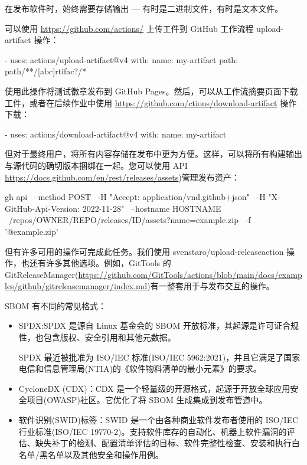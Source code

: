 
在发布软件时，始终需要存储输出 --- 有时是二进制文件，有时是文本文件。

可以使用 \url{https://github.com/actions/} 上传工件到 GitHub 工作流程 upload-artifact 操作：

\begin{shell}
- uses: actions/upload-artifact@v4
  with:
    name: my-artifact
    path: path/**/[abc]rtifac?/*
\end{shell}

使用此操作将测试徽章发布到 GitHub Pages。然后，可以从工作流摘要页面下载工件，或者在后续作业中使用 \url{https://github.com/ctions/download-artifact} 操作下载：

\begin{shell}
- uses: actions/download-artifact@v4
  with:
    name: my-artifact
\end{shell}

但对于最终用户，将所有内容存储在发布中更为方便。这样，可以将所有构建输出与源代码的确切版本捆绑在一起。您可以使用 API \url{https://docs.github.com/en/rest/releases/assets})管理发布资产：

\begin{shell}
gh api \
  --method POST \
  -H "Accept: application/vnd.github+json" \
  -H "X-GitHub-Api-Version: 2022-11-28" \
  --hostname HOSTNAME \
  /repos/OWNER/REPO/releases/ID/assets?name=example.zip \
  -f '@example.zip'
\end{shell}

但有许多可用的操作可完成此任务。我们使用 svenstaro/upload-releaseaction 操作，也还有许多其他选项。例如，GitTools 的 GitReleaseManager(\url{https://github.com/GitTools/actions/blob/main/docs/examples/github/gitreleasemanager/index.md})有一整套用于与发布交互的操作。

\mySubsubsection{6.8.4}{There’s more…}

SBOM 有不同的常见格式：

\begin{itemize}
\item 
SPDX:SPDX 是源自 Linux 基金会的 SBOM 开放标准，其起源是许可证合规性，也包含版权、安全引用和其他元数据。

SPDX 最近被批准为 ISO/IEC 标准(ISO/IEC 5962:2021)，并且它满足了国家电信和信息管理局(NTIA)的《软件物料清单的最小元素》的要求。

\item 
CycloneDX (CDX)：CDX 是一个轻量级的开源格式，起源于开放全球应用安全项目(OWASP)社区。它优化了将 SBOM 生成集成到发布管道中。

\item 
软件识别(SWID)标签：SWID 是一个由各种商业软件发布者使用的 ISO/IEC 行业标准(ISO/IEC 19770-2)。支持软件库存的自动化、机器上软件漏洞的评估、缺失补丁的检测、配置清单评估的目标、软件完整性检查、安装和执行白名单/黑名单以及其他安全和操作用例。
\end{itemize}

